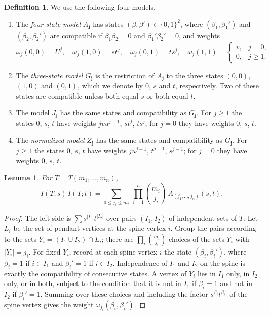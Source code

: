 \documentclass{amsart}
\newtheorem{lemma}[theorem]{Lemma}
\theoremstyle{definition}
\newtheorem{definition}[theorem]{Definition}
\theoremstyle{remark}
\numberwithin{equation}{section}
\newcommand{\jj}{\mathbf{j}}
\begin{document}
\begin{definition}\label{def:models}
We use the following four models.
\begin{enumerate}
\item The \emph{four-state model} $A_\jj$ has states $(\beta,\beta')\in\{0,1\}^2$, where $(\beta_1,\beta_1')$ and $(\beta_2,\beta_2')$ are compatible if $\beta_1\beta_2=0$ and $\beta_1'\beta_2'=0$, and weights
\[
\omega_j(0,0)=U^j,\quad \omega_j(1,0)=st^j,\quad \omega_j(0,1)=ts^j,\quad \omega_j(1,1)=\begin{cases}v,&j=0,\\0,&j\ge1.\end{cases}
\]
\item The \emph{three-state model} $G_\jj$ is the restriction of $A_\jj$ to the three states $(0,0)$, $(1,0)$ and $(0,1)$, which we denote by $0$, $s$ and $t$, respectively. Two of these states are compatible unless both equal $s$ or both equal $t$.
\item The model $J_\jj$ has the same states and compatibility as $G_\jj$. For $j\ge1$ the states $0$, $s$, $t$ have weights $jvu^{j-1}$, $st^j$, $ts^j$; for $j=0$ they have weights $0$, $s$, $t$.
\item The \emph{normalized model} $Z_\jj$ has the same states and compatibility as $G_\jj$. For $j\ge1$ the states $0$, $s$, $t$ have weights $ju^{j-1}$, $t^{j-1}$, $s^{j-1}$; for $j=0$ they have weights $0$, $s$, $t$.
\end{enumerate}
\end{definition}

\begin{lemma}\label{lem:pairs}
For $T=T(m_1,\dots,m_n)$,
\[
I(T;s)\,I(T;t)=\sum_{0\le j_i\le m_i}\ \prod_{i=1}^n\binom{m_i}{j_i}\,A_{(j_1,\dots,j_n)}(s,t).
\]
\end{lemma}

\begin{proof}
The left side is $\sum s^{|I_1|}t^{|I_2|}$ over pairs $(I_1,I_2)$ of independent sets of $T$. Let $L_i$ be the set of pendant vertices at the spine vertex $i$. Group the pairs according to the sets $Y_i=(I_1\cup I_2)\cap L_i$; there are $\prod_i\binom{m_i}{j_i}$ choices of the sets $Y_i$ with $|Y_i|=j_i$. For fixed $Y_i$, record at each spine vertex $i$ the state $(\beta_i,\beta_i')$, where $\beta_i=1$ if $i\in I_1$ and $\beta_i'=1$ if $i\in I_2$. Independence of $I_1$ and $I_2$ on the spine is exactly the compatibility of consecutive states. A vertex of $Y_i$ lies in $I_1$ only, in $I_2$ only, or in both, subject to the condition that it is not in $I_1$ if $\beta_i=1$ and not in $I_2$ if $\beta_i'=1$. Summing over these choices and including the factor $s^{\beta_i}t^{\beta_i'}$ of the spine vertex gives the weight $\omega_{j_i}(\beta_i,\beta_i')$.
\end{proof}
\end{document}
